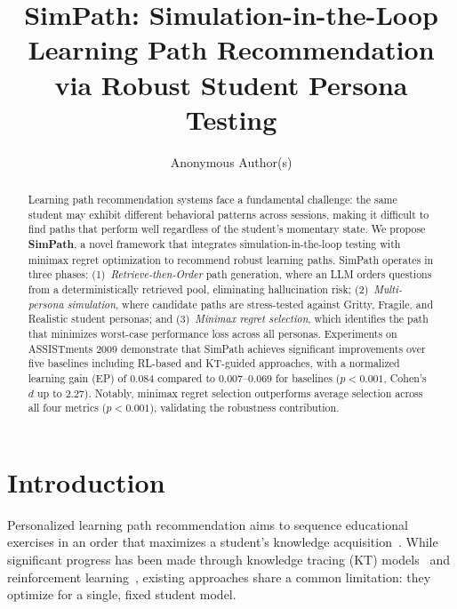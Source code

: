 \documentclass[runningheads]{llncs}
\begin{document}
\title{SimPath: Simulation-in-the-Loop Learning Path Recommendation\\via Robust Student Persona Testing}

\author{Anonymous Author(s)}

\maketitle

\begin{abstract}
Learning path recommendation systems face a fundamental challenge: the same student may exhibit different behavioral patterns across sessions, making it difficult to find paths that perform well regardless of the student's momentary state.
We propose \textbf{SimPath}, a novel framework that integrates simulation-in-the-loop testing with minimax regret optimization to recommend robust learning paths.
SimPath operates in three phases: (1)~\emph{Retrieve-then-Order} path generation, where an LLM orders questions from a deterministically retrieved pool, eliminating hallucination risk; (2)~\emph{Multi-persona simulation}, where candidate paths are stress-tested against Gritty, Fragile, and Realistic student personas; and (3)~\emph{Minimax regret selection}, which identifies the path that minimizes worst-case performance loss across all personas.
Experiments on ASSISTments 2009 demonstrate that SimPath achieves significant improvements over five baselines including RL-based and KT-guided approaches, with a normalized learning gain (EP) of 0.084 compared to 0.007--0.069 for baselines ($p<0.001$, Cohen's $d$ up to 2.27).
Notably, minimax regret selection outperforms average selection across all four metrics ($p<0.001$), validating the robustness contribution.
\end{abstract}


\section{Introduction}

Personalized learning path recommendation aims to sequence educational exercises in an order that maximizes a student's knowledge acquisition~\cite{cseal2019,src2023}.
While significant progress has been made through knowledge tracing (KT) models~\cite{dkt2015,akt2021} and reinforcement learning~\cite{cseal2019}, existing approaches share a common limitation: they optimize for a single, fixed student model.
\end{document}
